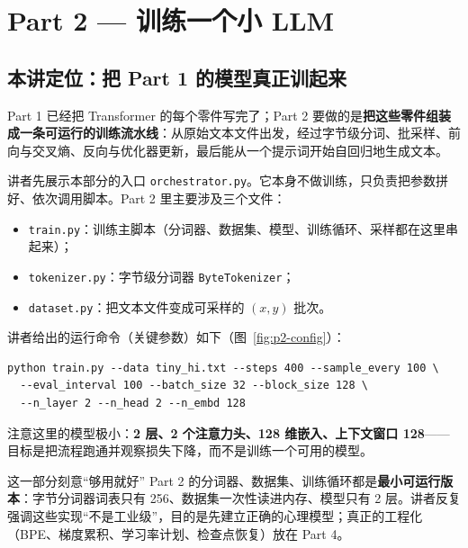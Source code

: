
\section{Part 2 — 训练一个小 LLM}

\subsection{本讲定位：把 Part 1 的模型真正训起来}

Part 1 已经把 Transformer 的每个零件写完了；Part 2 要做的是\textbf{把这些零件组装成一条可运行的训练流水线}：从原始文本文件出发，经过字节级分词、批采样、前向与交叉熵、反向与优化器更新，最后能从一个提示词开始自回归地生成文本。

讲者先展示本部分的入口 \texttt{orchestrator.py}。它本身不做训练，只负责把参数拼好、依次调用脚本。Part 2 里主要涉及三个文件：

\begin{itemize}
\item \texttt{train.py}：训练主脚本（分词器、数据集、模型、训练循环、采样都在这里串起来）；
\item \texttt{tokenizer.py}：字节级分词器 \texttt{ByteTokenizer}；
\item \texttt{dataset.py}：把文本文件变成可采样的 $(x,y)$ 批次。
\end{itemize}

讲者给出的运行命令（关键参数）如下（图~\ref{fig:p2-config}）：

\begin{lstlisting}[caption={Part 2 的运行命令（据视频 orchestrator 传参整理）。}]
python train.py --data tiny_hi.txt --steps 400 --sample_every 100 \
  --eval_interval 100 --batch_size 32 --block_size 128 \
  --n_layer 2 --n_head 2 --n_embd 128
\end{lstlisting}

注意这里的模型极小：\textbf{2 层、2 个注意力头、128 维嵌入、上下文窗口 128}——目标是把流程跑通并观察损失下降，而不是训练一个可用的模型。

\begin{knowledgebox}{这一部分刻意“够用就好”}
Part 2 的分词器、数据集、训练循环都是\textbf{最小可运行版本}：字节分词器词表只有 256、数据集一次性读进内存、模型只有 2 层。讲者反复强调这些实现“不是工业级”，目的是先建立正确的心理模型；真正的工程化（BPE、梯度累积、学习率计划、检查点恢复）放在 Part 4。
\end{knowledgebox}


